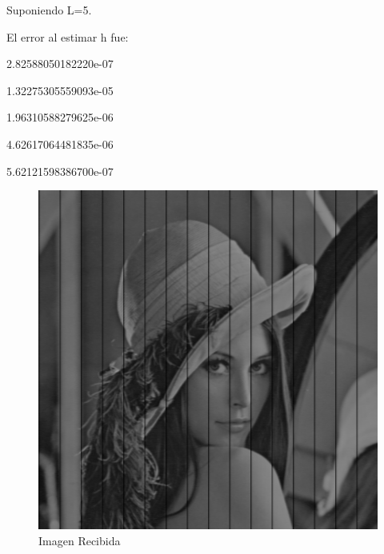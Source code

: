 \documentclass{article}
\begin{document}
\begin{multicols}{2}
\begin{figure}[H]
\end{figure}




\par \large{Suponiendo L=5.}
\par El error al estimar h fue:\\ 
\par   2.82588050182220e-07
\par   1.32275305559093e-05
\par   1.96310588279625e-06
\par   4.62617064481835e-06
\par   5.62121598386700e-07\\


\begin{figure}[H]
\centering
\includegraphics[scale=0.2]{../img/received_part3c.png}
\caption{Imagen Recibida}

\end{figure}


\end{multicols}
\end{document}

